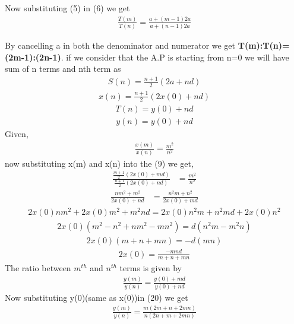 \documentclass[journal,12pt,twocolumn]{IEEEtran}
\theoremstyle{remark}
\begin{document}
 Now substituting (5) in (6) we get \begin{align}\frac{T(m)}{T(n)}=\frac{a+(m-1)2a}{a+(n-1)2a}\end{align}

 
 
By cancelling a in both the denominator and numerator we get \textbf{T(m):T(n)=(2m-1):(2n-1)}.
if we consider that the A.P is starting from n=0 we will have sum of n terms and nth term as 
\begin{align}S(n)=\frac{n+1}{2}(2a+nd)\end{align}
\begin{align}x(n)=\frac{n+1}{2}(2x(0)+nd)\end{align}
\begin{align}T(n)=y(0)+nd\end{align}
\begin{align}y(n)=y(0)+nd\end{align}
Given,
\begin{align}\frac{x(m)}{x(n)}=\frac{m^2}{n^2}\end{align}
now substituting x(m) and x(n) into the (9) we get,
\begin{align}\frac{\frac{m+1}{2} {(2x(0)+md)}}{\frac{n+1}{2} {(2x(0)+nd)}}&= 
 \frac{m^2}{n^2}\end{align}
 \begin{align}\frac{nm^2+m^2}{2x(0)+nd}&=\frac{n^2m+n^2}{2x(0)+md}
 \end{align}
 \begin{align}
     2x(0)nm^2+2x(0)m^2+m^2nd
     =2x(0)n^2m+n^2md+2 x(0)n^2
 \end{align}
\begin{align} 2x(0)(m^2-n^2+nm^2-mn^2)=d(n^2m-m^2n)\end{align}
\begin{align}
    2x(0)(m+n+mn)=-d(mn)
\end{align}
\begin{align}
     2x(0)=\frac{-mnd}{m+n+mn}
\end{align}
The ratio between $m^{th}$ and $n^{th}$ terms is given by
 \begin{align}\frac{y(m)}{y(n)}=\frac{y(0)+md}{y(0)+nd}\end{align}
 Now substituting y(0)(same as x(0))in (20) we get 
\begin{align} \frac{y(m)}{y(n)}=\frac{m(2m+n+2mn)}{n(2n+m+2mn)}\end{align}
\pagebreak


\renewcommand{\thefigure}{\theenumi}
\renewcommand{\thetable}{\theenumi}
\end{document}
